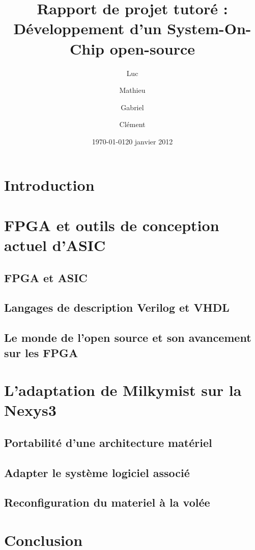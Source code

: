 \documentclass{report}
\date{\today}
\author{}
\title{}
\title{Rapport de projet tutoré : Développement d'un System-On-Chip open-source}
\author{\bsc{DUZAN} Luc \and \bsc{LONGO} Mathieu \and \bsc{FARACHE} Gabriel \and \bsc{MICHAUD} Clément }
\date{20 janvier 2012}
\begin{document}
\maketitle

\tableofcontents

\chapter*{Introduction}

\chapter{FPGA et outils de conception actuel d'ASIC}

\section{FPGA et ASIC}
    

\section{Langages de description Verilog et VHDL}
    

\section{Le monde de l'open source et son avancement sur les FPGA}
    

\chapter{L'adaptation de Milkymist sur la Nexys3}

\section{Portabilité d'une architecture matériel}
    

\section{Adapter le système logiciel associé}
    
    \newpage

\section{Reconfiguration du materiel à la volée}
    
	\newpage

\chapter*{Conclusion}


\end{document}
